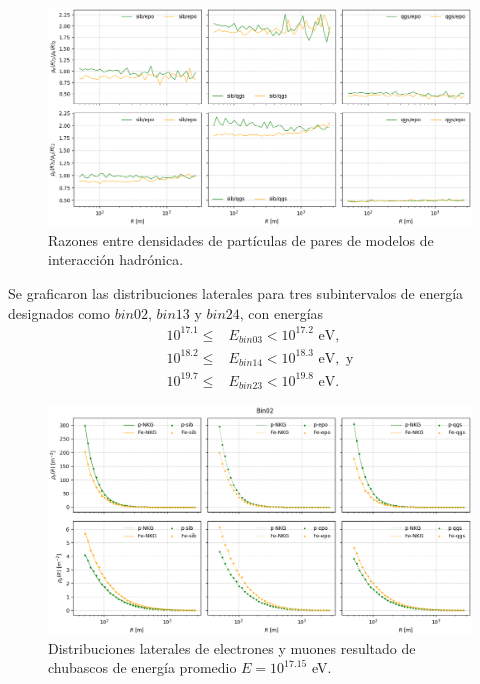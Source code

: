 \documentclass[11pt,table,compress]{beamer}
\begin{document}
	\begin{frame}
		\begin{figure}[] 
		\centering
		\includegraphics[width=\textwidth]{Figuras/distlat_models}
		\caption{Razones entre densidades de partículas de pares de modelos de interacción hadrónica.}
		\label{fig:distlat_modelos}
		\end{figure}
	\end{frame}
	
	\begin{frame}
	Se graficaron las distribuciones laterales para tres subintervalos de energía designados como $bin02$, $bin13$ y $bin24$, con energías
\begin{align*}
10^{17.1} \leq & E_{bin03} < 10^{17.2} \text{ eV}, \\
10^{18.2} \leq & E_{bin14} < 10^{18.3} \text{ eV}, \text{ y}\\
10^{19.7} \leq & E_{bin23} < 10^{19.8} \text{ eV}.
\end{align*}
	\end{frame}
	
	\begin{frame}
		\begin{figure}[h] 
		\centering
		\includegraphics[height=0.7\textheight, width=\textwidth]{Figuras/distlat_bin02}
		\caption{Distribuciones laterales de electrones y muones resultado de chubascos de energía promedio $E=10^{17.15}$ eV.}
		\label{fig:distlat_bin02}
		\end{figure}
	\end{frame}
	
\end{document}
